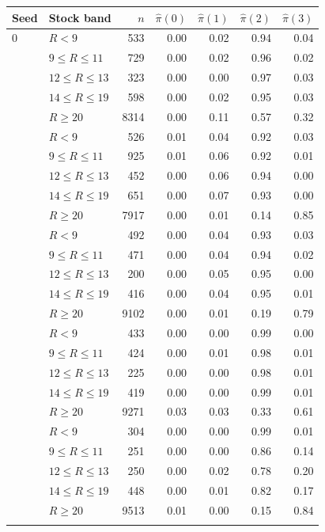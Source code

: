 \begin{tabular}{llrrrrr}
\toprule
Seed & Stock band & $n$ & $\hat\pi(0)$ & $\hat\pi(1)$ & $\hat\pi(2)$ & $\hat\pi(3)$ \\
\midrule
0 & $R<9$ & 533 & 0.00 & 0.02 & 0.94 & 0.04 \\
 & $9\le R\le 11$ & 729 & 0.00 & 0.02 & 0.96 & 0.02 \\
 & $12\le R\le 13$ & 323 & 0.00 & 0.00 & 0.97 & 0.03 \\
 & $14\le R\le 19$ & 598 & 0.00 & 0.02 & 0.95 & 0.03 \\
 & $R\ge 20$ & 8314 & 0.00 & 0.11 & 0.57 & 0.32 \\
\addlinespace
1 & $R<9$ & 526 & 0.01 & 0.04 & 0.92 & 0.03 \\
 & $9\le R\le 11$ & 925 & 0.01 & 0.06 & 0.92 & 0.01 \\
 & $12\le R\le 13$ & 452 & 0.00 & 0.06 & 0.94 & 0.00 \\
 & $14\le R\le 19$ & 651 & 0.00 & 0.07 & 0.93 & 0.00 \\
 & $R\ge 20$ & 7917 & 0.00 & 0.01 & 0.14 & 0.85 \\
\addlinespace
2 & $R<9$ & 492 & 0.00 & 0.04 & 0.93 & 0.03 \\
 & $9\le R\le 11$ & 471 & 0.00 & 0.04 & 0.94 & 0.02 \\
 & $12\le R\le 13$ & 200 & 0.00 & 0.05 & 0.95 & 0.00 \\
 & $14\le R\le 19$ & 416 & 0.00 & 0.04 & 0.95 & 0.01 \\
 & $R\ge 20$ & 9102 & 0.00 & 0.01 & 0.19 & 0.79 \\
\addlinespace
3 & $R<9$ & 433 & 0.00 & 0.00 & 0.99 & 0.00 \\
 & $9\le R\le 11$ & 424 & 0.00 & 0.01 & 0.98 & 0.01 \\
 & $12\le R\le 13$ & 225 & 0.00 & 0.00 & 0.98 & 0.01 \\
 & $14\le R\le 19$ & 419 & 0.00 & 0.00 & 0.99 & 0.01 \\
 & $R\ge 20$ & 9271 & 0.03 & 0.03 & 0.33 & 0.61 \\
\addlinespace
4 & $R<9$ & 304 & 0.00 & 0.00 & 0.99 & 0.01 \\
 & $9\le R\le 11$ & 251 & 0.00 & 0.00 & 0.86 & 0.14 \\
 & $12\le R\le 13$ & 250 & 0.00 & 0.02 & 0.78 & 0.20 \\
 & $14\le R\le 19$ & 448 & 0.00 & 0.01 & 0.82 & 0.17 \\
 & $R\ge 20$ & 9513 & 0.01 & 0.00 & 0.15 & 0.84 \\
\addlinespace
\bottomrule
\end{tabular}
